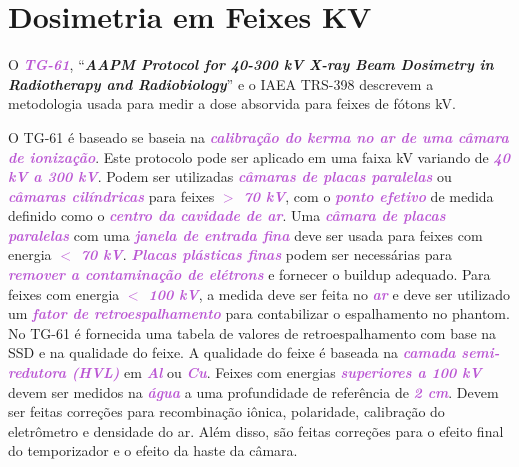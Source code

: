 \documentclass[11pt,a4paper]{article}
\begin{document}
\section{Dosimetria em Feixes KV}

	O \textcolor{MediumOrchid}{\textbf{\textit{TG-61}}}, ``\textbf{\textit{AAPM Protocol for 40-300 kV X-ray Beam Dosimetry in Radiotherapy and Radiobiology}}'' e o IAEA TRS-398 descrevem a metodologia usada para medir a dose absorvida para feixes de fótons kV. 
	
	O  TG-61 é baseado se baseia na \textcolor{MediumOrchid}{\textbf{\textit{calibração do kerma no ar de uma câmara de ionização}}}. Este protocolo pode ser aplicado em uma faixa kV variando de \textcolor{MediumOrchid}{\textbf{\textit{40 kV a 300 kV}}}. Podem ser utilizadas \textcolor{MediumOrchid}{\textbf{\textit{câmaras de placas paralelas}}} ou \textcolor{MediumOrchid}{\textbf{\textit{câmaras cilíndricas}}} para feixes \textcolor{MediumOrchid}{\textbf{\textit{$>$ 70 kV}}}, com o \textcolor{MediumOrchid}{\textbf{\textit{ponto efetivo}}} de medida definido como o \textcolor{MediumOrchid}{\textbf{\textit{centro da cavidade de ar}}}. Uma \textcolor{MediumOrchid}{\textbf{\textit{câmara de placas paralelas}}} com uma \textcolor{MediumOrchid}{\textbf{\textit{janela de entrada fina}}} deve ser usada para feixes com energia  \textcolor{MediumOrchid}{\textbf{\textit{$<$ 70 kV}}}. \textcolor{MediumOrchid}{\textbf{\textit{Placas plásticas finas}}} podem ser necessárias para \textcolor{MediumOrchid}{\textbf{\textit{remover a contaminação de elétrons}}} e fornecer o buildup adequado. Para feixes com energia \textcolor{MediumOrchid}{\textbf{\textit{$<$ 100 kV}}}, a medida deve ser feita no \textcolor{MediumOrchid}{\textbf{\textit{ar}}} e deve ser utilizado um  \textcolor{MediumOrchid}{\textbf{\textit{fator de retroespalhamento}}}  para contabilizar o espalhamento no phantom. No TG-61 é fornecida uma tabela de valores de retroespalhamento com base na SSD e na qualidade do feixe. A qualidade do feixe é baseada na \textcolor{MediumOrchid}{\textbf{\textit{camada semi-redutora (HVL)}}} em \textcolor{MediumOrchid}{\textbf{\textit{Al}}} ou \textcolor{MediumOrchid}{\textbf{\textit{Cu}}}. Feixes com energias \textcolor{MediumOrchid}{\textbf{\textit{superiores a 100 kV}}} devem ser medidos na \textcolor{MediumOrchid}{\textbf{\textit{água}}} a uma profundidade de referência de \textcolor{MediumOrchid}{\textbf{\textit{2 cm}}}. Devem ser feitas correções para recombinação iônica, polaridade, calibração do eletrômetro e densidade do ar. Além disso, são feitas correções para o efeito final do temporizador e o efeito da haste da câmara.
\end{document}
